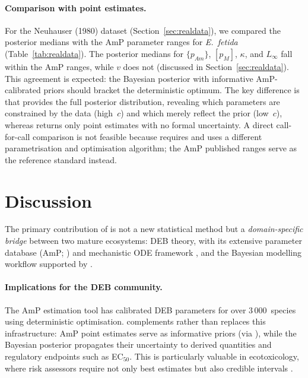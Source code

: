 \documentclass[article,shortnames]{jss}
\newcommand{\pAm}{\{p_{Am}\}}
\newcommand{\pM}{[p_M]}
\begin{document}
\paragraph{Comparison with  point estimates.}
For the Neuhauser (1980) dataset (Section~\ref{sec:realdata}), we
compared the  posterior medians with the AmP
parameter ranges for \emph{E.~fetida} (Table~\ref{tab:realdata}).
The posterior medians for $\pAm$, $\pM$, $\kappa$, and $L_\infty$
fall within the AmP ranges, while $v$ does not (discussed in
Section~\ref{sec:realdata}).  This agreement is expected: the
Bayesian posterior with informative AmP-calibrated priors should
bracket the deterministic optimum.  The key difference is that
 provides the full posterior distribution,
revealing which parameters are constrained by the data (high~$c$)
and which merely reflect the prior (low~$c$), whereas
 returns only point estimates with no formal
uncertainty.  A direct call-for-call comparison is not feasible
because  requires  and uses a
different parametrisation and optimisation algorithm; the AmP
published ranges serve as the reference standard instead.


\section{Discussion} \label{sec:discussion}

The primary contribution of  is not a new
statistical method but a \emph{domain-specific bridge} between
two mature ecosystems: DEB theory, with its extensive parameter
database (AmP; \citealp{MarquesAmP2018}) and mechanistic ODE
framework \citep{Kooijman2010, NisbetDEB2000}, and the Bayesian
modelling workflow supported by 
\citep{CarpenterStan2017, GabryPPC2019}.

\paragraph{Implications for the DEB community.}
The AmP estimation tool has calibrated DEB parameters for over
3\,000~species using deterministic optimisation.  
complements rather than replaces this infrastructure: AmP point
estimates serve as informative priors (via ),
while the Bayesian posterior propagates their uncertainty to
derived quantities and regulatory endpoints such as EC$_{50}$.
This is particularly valuable in ecotoxicology, where risk
assessors require not only best estimates but also credible
intervals \citep{BilloirBayesDEB2008, JagerGUTS2011}.
\end{document}
